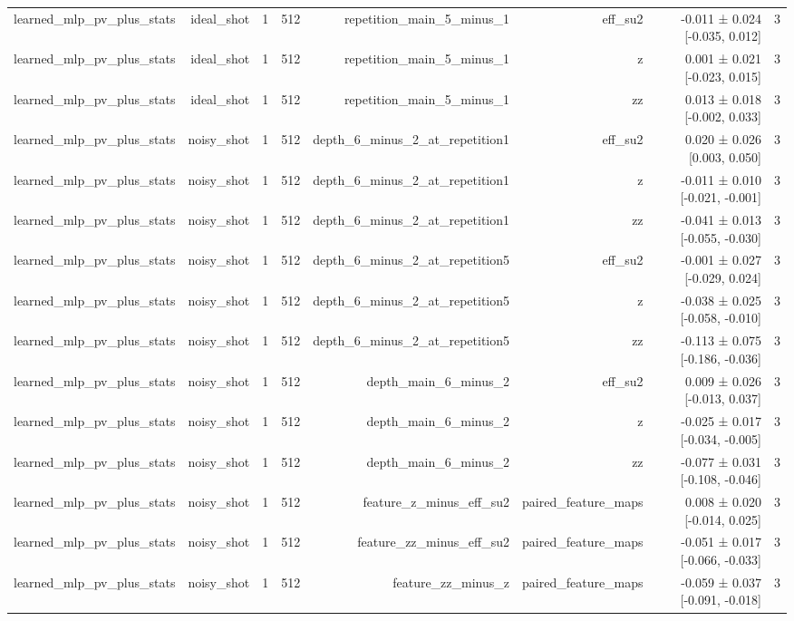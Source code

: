\begin{table}
\begin{tabular}{lrrrrrrr}
learned\_mlp\_pv\_plus\_stats & ideal\_shot & 1 & 512 & repetition\_main\_5\_minus\_1 & eff\_su2 & -0.011 ± 0.024 [-0.035, 0.012] & 3 \\
learned\_mlp\_pv\_plus\_stats & ideal\_shot & 1 & 512 & repetition\_main\_5\_minus\_1 & z & 0.001 ± 0.021 [-0.023, 0.015] & 3 \\
learned\_mlp\_pv\_plus\_stats & ideal\_shot & 1 & 512 & repetition\_main\_5\_minus\_1 & zz & 0.013 ± 0.018 [-0.002, 0.033] & 3 \\
learned\_mlp\_pv\_plus\_stats & noisy\_shot & 1 & 512 & depth\_6\_minus\_2\_at\_repetition1 & eff\_su2 & 0.020 ± 0.026 [0.003, 0.050] & 3 \\
learned\_mlp\_pv\_plus\_stats & noisy\_shot & 1 & 512 & depth\_6\_minus\_2\_at\_repetition1 & z & -0.011 ± 0.010 [-0.021, -0.001] & 3 \\
learned\_mlp\_pv\_plus\_stats & noisy\_shot & 1 & 512 & depth\_6\_minus\_2\_at\_repetition1 & zz & -0.041 ± 0.013 [-0.055, -0.030] & 3 \\
learned\_mlp\_pv\_plus\_stats & noisy\_shot & 1 & 512 & depth\_6\_minus\_2\_at\_repetition5 & eff\_su2 & -0.001 ± 0.027 [-0.029, 0.024] & 3 \\
learned\_mlp\_pv\_plus\_stats & noisy\_shot & 1 & 512 & depth\_6\_minus\_2\_at\_repetition5 & z & -0.038 ± 0.025 [-0.058, -0.010] & 3 \\
learned\_mlp\_pv\_plus\_stats & noisy\_shot & 1 & 512 & depth\_6\_minus\_2\_at\_repetition5 & zz & -0.113 ± 0.075 [-0.186, -0.036] & 3 \\
learned\_mlp\_pv\_plus\_stats & noisy\_shot & 1 & 512 & depth\_main\_6\_minus\_2 & eff\_su2 & 0.009 ± 0.026 [-0.013, 0.037] & 3 \\
learned\_mlp\_pv\_plus\_stats & noisy\_shot & 1 & 512 & depth\_main\_6\_minus\_2 & z & -0.025 ± 0.017 [-0.034, -0.005] & 3 \\
learned\_mlp\_pv\_plus\_stats & noisy\_shot & 1 & 512 & depth\_main\_6\_minus\_2 & zz & -0.077 ± 0.031 [-0.108, -0.046] & 3 \\
learned\_mlp\_pv\_plus\_stats & noisy\_shot & 1 & 512 & feature\_z\_minus\_eff\_su2 & paired\_feature\_maps & 0.008 ± 0.020 [-0.014, 0.025] & 3 \\
learned\_mlp\_pv\_plus\_stats & noisy\_shot & 1 & 512 & feature\_zz\_minus\_eff\_su2 & paired\_feature\_maps & -0.051 ± 0.017 [-0.066, -0.033] & 3 \\
learned\_mlp\_pv\_plus\_stats & noisy\_shot & 1 & 512 & feature\_zz\_minus\_z & paired\_feature\_maps & -0.059 ± 0.037 [-0.091, -0.018] & 3 \\

\end{tabular}
\end{table}
